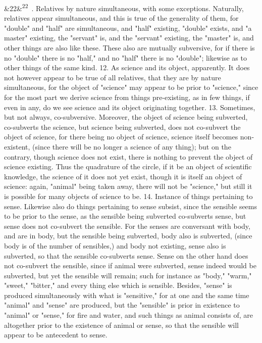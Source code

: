 \documentclass[12pt]{article}
\newcommand{\para}[1][]{\par\noindent\ifx&#1&\else\textsuperscript{\footnotesize #1}~\fi}
\begin{document}
\para[22] 11. Relatives by nature simultaneous, with some exceptions. Naturally, relatives appear simultaneous, and this is true of the generality of them, for "double" and "half" are simultaneous, and "half" existing, "double" exists, and "a master" existing, the "servant" is, and the "servant" existing, the "master" is, and other things are also like these. These also are mutually subversive, for if there is no "double" there is no "half," and no "half" there is no "double"; likewise as to other things of the same kind. 12. As science and its object, apparently. It does not however appear to be true of all relatives, that they are by nature simultaneous, for the object of "science" may appear to be prior to "science," since for the most part we derive science from things pre-existing, as in few things, if even in any, do we see science and its object originating together. 13. Sometimes, but not always, co-subversive. Moreover, the object of science being subverted, co-subverts the science, but science being subverted, does not co-subvert the object of science, for there being no object of science, science itself becomes non-existent, (since there will be no longer a science of any thing); but on the contrary, though science does not exist, there is nothing to prevent the object of science existing. Thus the quadrature of the circle, if it be an object of scientific knowledge, the science of it does not yet exist, though it is itself an object of science: again, "animal" being taken away, there will not be "science," but still it is possible for many objects of science to be. 14. Instance of things pertaining to sense. Likewise also do things pertaining to sense subsist, since the sensible seems to be prior to the sense, as the sensible being subverted co-subverts sense, but sense does not co-subvert the sensible. For the senses are conversant with body, and are in body, but the sensible being subverted, body also is subverted, (since body is of the number of sensibles,) and body not existing, sense also is subverted, so that the sensible co-subverts sense. Sense on the other hand does not co-subvert the sensible, since if animal were subverted, sense indeed would be subverted, but yet the sensible will remain; such for instance as "body," "warm," "sweet," "bitter," and every thing else which is sensible. Besides, "sense" is produced simultaneously with what is "sensitive," for at one and the same time "animal" and "sense" are produced, but the "sensible" is prior in existence to "animal" or "sense," for fire and water, and such things as animal consists of, are altogether prior to the existence of animal or sense, so that the sensible will appear to be antecedent to sense.
\end{document}
